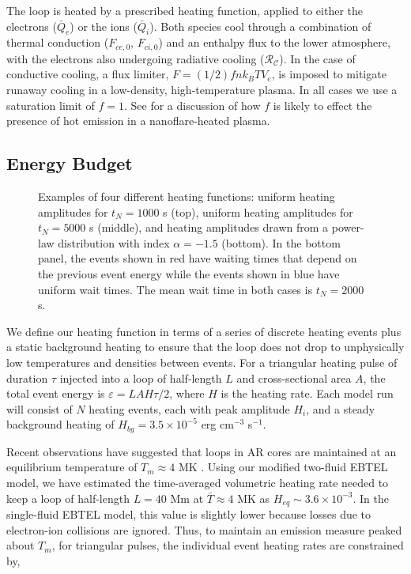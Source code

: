 \documentclass[preprint,linenumbers]{aastex}
\begin{document}
	\par The loop is heated by a prescribed heating function, applied to either the electrons ($\bar{Q}_e$) or the ions ($\bar{Q}_i$). Both species cool through a combination of thermal conduction ($F_{ce,0},\,F_{ci,0}$) and an enthalpy flux to the lower atmosphere, with the electrons also undergoing radiative cooling ($\mathcal{R_C}$). In the case of conductive cooling, a flux limiter, $F=(1/2)fnk_BTV_e$, is imposed to mitigate runaway cooling in a low-density, high-temperature plasma. In all cases we use a saturation limit of $f=1$. See  for a discussion of how $f$ is likely to effect the presence of hot emission in a nanoflare-heated plasma.
	\subsection{Energy Budget}
	\label{subsec:params}
	\begin{figure}
		\caption{Examples of four different heating functions: uniform heating amplitudes for $t_N=1000$ s (top), uniform heating amplitudes for $t_N=5000$ s (middle), and heating amplitudes drawn from a power-law distribution with index $\alpha=-1.5$ (bottom). In the bottom panel, the events shown in red have waiting times that depend on the previous event energy while the events shown in blue have uniform wait times. The mean wait time in both cases is $t_N=2000$ s.}
		\label{fig:heating_funcs}
	\end{figure}
	\par We define our heating function in terms of a series of discrete heating events plus a static background heating to ensure that the loop does not drop to unphysically low temperatures and densities between events. For a triangular heating pulse of duration $\tau$ injected into a loop of half-length $L$ and cross-sectional area $A$, the total  event energy is $\varepsilon=LAH\tau/2$, where $H$ is the heating rate. Each model run will consist of $N$ heating events, each with peak amplitude $H_i$, and a steady background heating of $H_{bg}=3.5\times10^{-5}$ erg cm$^{-3}$ s$^{-1}$.
	\par Recent observations have suggested that loops in AR cores are maintained at an equilibrium temperature of $T_{m}\approx4$ MK \citep{warren_constraints_2011,warren_systematic_2012}. Using our modified two-fluid EBTEL model, we have estimated the time-averaged volumetric heating rate needed to keep a loop of half-length $L=40$ Mm at $\bar{T}\approx4$ MK as  $H_{eq}\sim3.6\times10^{-3}$. In the single-fluid EBTEL model, this value is slightly lower because losses due to electron-ion collisions are ignored. Thus, to maintain an emission measure peaked about $T_{m}$, for triangular pulses, the individual event heating rates are constrained by,
\end{document}
